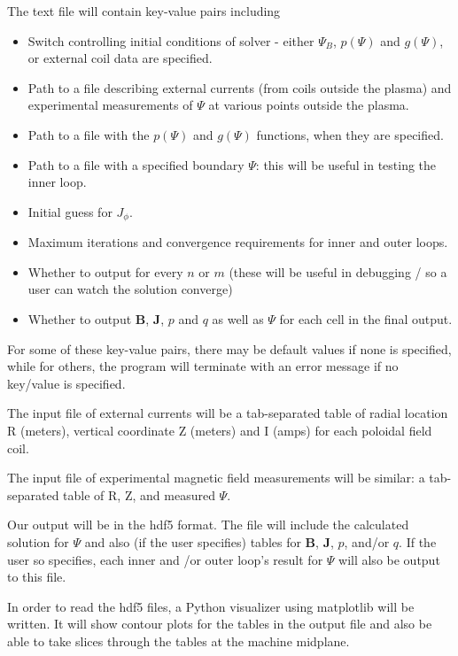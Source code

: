 \documentclass[paper=letter, fontsize=11pt]{scrartcl} %
\begin{document}
The text file will contain key-value pairs including
\begin{itemize}
\item Switch controlling initial conditions of solver - either $\Psi_B$, $p(\Psi)$ and $g(\Psi)$, or external coil data are specified. 
\item Path to a file describing external currents (from coils outside the plasma) and experimental measurements of $\Psi$ at various points outside the plasma.
\item Path to a file with the $p(\Psi)$ and $g(\Psi)$ functions, when they are specified.
\item Path to a file with a specified boundary $\Psi$: this will be useful in testing the inner loop.
\item Initial guess for $J_\phi$. 
\item Maximum iterations and convergence requirements for inner and outer loops. 
\item Whether to output for every $n$ or $m$ (these will be useful in debugging / so a user can watch the solution converge)
\item Whether to output $\mathbf{B}$, $\mathbf{J}$, $p$ and $q$ as well as $\Psi$ for each cell in the final output.
\end{itemize}

For some of these key-value pairs, there may be default values if none is specified, while for others, the program will terminate with an error message if no key/value is specified.

The input file of external currents will be a tab-separated table of radial location R (meters), vertical coordinate Z (meters) and I (amps) for each poloidal field coil.

The input file of experimental magnetic field measurements will be similar: a tab-separated table of R, Z, and measured $\Psi$.

Our output will be in the hdf5 format. The file will include the calculated solution for $\Psi$ and also (if the user specifies) tables for $\mathbf{B}$, $\mathbf{J}$, $p$, and/or $q$. If the user so specifies, each inner and /or outer loop's result for $\Psi$ will also be output to this file.

In order to read the hdf5 files, a Python visualizer using matplotlib will be written. It will show contour plots for the tables in the output file and also be able to take slices through the tables at the machine midplane.

\end{document}
